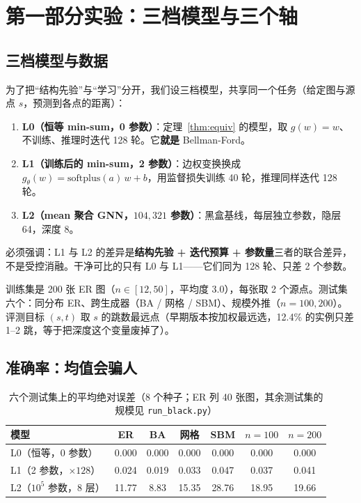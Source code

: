 \section{第一部分实验：三档模型与三个轴}\label{sec:resultsA}

\subsection{三档模型与数据}

为了把“结构先验”与“学习”分开，我们设三档模型，共享同一个任务（给定图与源点 $s$，预测到各点的距离）：

\begin{enumerate}[leftmargin=1.8em]
\item \textbf{L0（恒等 min-sum，0 参数）}：定理~\ref{thm:equiv} 的模型，取 $g(w)=w$、不训练、推理时迭代 128 轮。它\textbf{就是} Bellman-Ford。
\item \textbf{L1（训练后的 min-sum，2 参数）}：边权变换换成 $g_\theta(w)=\mathrm{softplus}(a)\,w+b$，用监督损失训练 40 轮，推理同样迭代 128 轮。
\item \textbf{L2（mean 聚合 GNN，$104{,}321$ 参数）}：黑盒基线，每层独立参数，隐层 64，深度 8。
\end{enumerate}

必须强调：L1 与 L2 的差异是\textbf{结构先验 + 迭代预算 + 参数量}三者的联合差异，不是受控消融。干净可比的只有 L0 与 L1——它们同为 128 轮、只差 2 个参数。

训练集是 200 张 ER 图（$n\in[12,50]$，平均度 3.0），每张取 2 个源点。测试集六个：同分布 ER、跨生成器（BA / 网格 / SBM）、规模外推（$n=100,200$）。评测目标 $(s,t)$ 取 $s$ 的跳数最远点（早期版本按加权最远选，12.4\% 的实例只差 1--2 跳，等于把深度这个变量废掉了）。

\subsection{准确率：均值会骗人}

\begin{table}[H]
\centering
\caption{六个测试集上的平均绝对误差（8 个种子；ER 列 40 张图，其余测试集的规模见 \texttt{run\_black.py}）}
\label{tab:acc}
\small
\setlength{\tabcolsep}{4pt}
\begin{tabular}{lcccccc}
\toprule
模型 & ER & BA & 网格 & SBM & $n{=}100$ & $n{=}200$ \\
\midrule
L0（恒等，0 参数） & 0.000 & 0.000 & 0.000 & 0.000 & 0.000 & 0.000 \\
L1（2 参数，$\times128$） & 0.024 & 0.019 & 0.033 & 0.047 & 0.037 & 0.041 \\
L2（$10^5$ 参数，8 层） & 11.77 & 8.83 & 15.35 & 28.76 & 18.95 & 19.66 \\
\bottomrule
\end{tabular}
\end{table}

